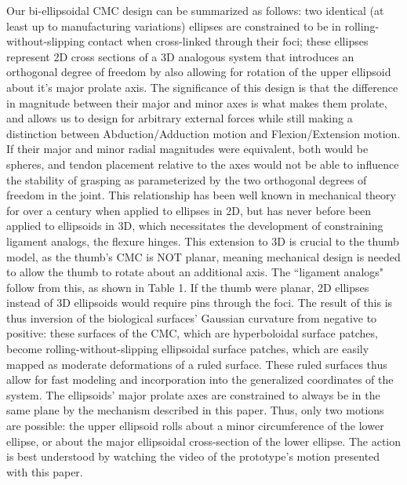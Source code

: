 \documentclass[letterpaper, 10 pt, conference]{ieeeconf}
\begin{document}
Our bi-ellipsoidal CMC design can be summarized as follows: two identical (at least up to manufacturing variations)
 ellipses are constrained to be in rolling-without-slipping contact when cross-linked through their foci; these ellipses represent 2D cross sections of a 3D analogous system that introduces an orthogonal degree of freedom by also allowing for rotation of the upper ellipsoid about it's major prolate axis. The significance of this design is that the difference in magnitude between their major and minor axes is what makes them prolate, and allows us to design for arbitrary external forces while still making a distinction between Abduction/Adduction motion and Flexion/Extension motion. If their major and minor radial magnitudes were equivalent, both would be spheres, and tendon placement relative to the axes would not be able to influence the stability of grasping as parameterized by the two orthogonal degrees of freedom in the joint. This relationship has been well known in mechanical theory for over a century when applied to ellipses in 2D, but has never before been applied to ellipsoids in 3D, which necessitates the development of constraining ligament analogs, the flexure hinges. This extension to 3D is crucial to the thumb model, as the thumb's CMC is NOT planar, meaning mechanical design is needed to allow the thumb to rotate about an additional axis. The ``ligament analogs" follow from this, as shown in Table 1. If the thumb were planar, 2D ellipses instead of 3D ellipsoids would require pins through the foci. The result of this is thus inversion of the biological surfaces' Gaussian curvature from negative to positive: these surfaces of the CMC, which are hyperboloidal surface patches, become rolling-without-slipping ellipsoidal surface patches, which are easily mapped as moderate deformations of a ruled surface. These ruled surfaces thus allow for fast modeling and incorporation into the generalized coordinates of the system. The ellipsoids' major prolate axes are constrained to always be in the same plane by the mechanism described in this paper. Thus, only two motions are possible: the upper ellipsoid rolls about a minor circumference of the lower ellipse, or about the major ellipsoidal cross-section of the lower ellipse. The action is best understood by watching the video of the prototype's motion presented with this paper.
\end{document}
